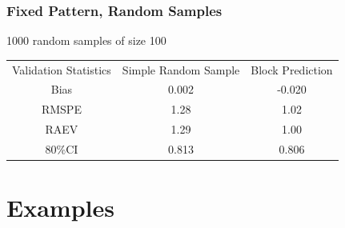 \documentclass[mathserif,compress]{beamer}\usepackage{graphicx, color}
\newcommand{\cre}[1]{\color{red!70!black}#1}
\newcommand{\cbl}[1]{\color{blue!70!black}#1}
\begin{document}

\begin{frame}[fragile]
\frametitle{Fixed Pattern, Random Samples}

1000 random samples of size 100 \\
\footnotesize
	\begin{table}[ht]
	\centering
	\begin{tabular}{ccc}
	Validation Statistics & Simple Random Sample & Block Prediction \\ 
	\cbl{Bias} & \cre{0.002} & \cre{-0.020} \\ 
	\cbl{RMSPE} & \cre{1.28} & \cre{1.02} \\ 
	\cbl{RAEV} & \cre{1.29} & \cre{1.00} \\ 
	\cbl{80\%CI} & \cre{0.813} & \cre{0.806} \\ 
	\end{tabular}
	\end{table}

\end{frame}



\section{Examples}
\end{document}
